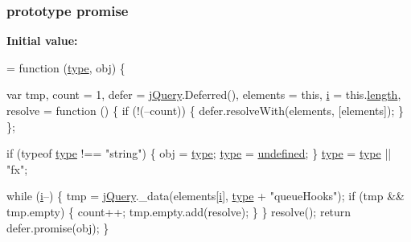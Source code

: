 \subsubsection[{\texorpdfstring{promise}{promise}}]{ {\bf prototype} promise}\hypertarget{jquery-2_82_81-vsdoc_8js_a06426ace6e929cd19d94010b6c27109d}{}\label{jquery-2_82_81-vsdoc_8js_a06426ace6e929cd19d94010b6c27109d}
{\bfseries Initial value\+:}
\begin{DoxyCode}
= \textcolor{keyword}{function} (\hyperlink{jquery-2_82_81-vsdoc_8js_a3940565e83a9bfd10d95ffd27536da91}{type}, obj) \{
        

        var tmp,
            count = 1,
            defer = \hyperlink{jquery-2_82_81-vsdoc_8js_add5237586d970a38a81f990e8eb28c6c}{jQuery}.Deferred(),
            elements = \textcolor{keyword}{this},
            \hyperlink{geolocation-marker_8js_a0325b7ce0988782a8032e720ef3aa411}{i} = this.\hyperlink{jquery-2_82_81-vsdoc_8js_aa7de35d58da66d9944ab9cbe82c19640}{length},
            resolve = \textcolor{keyword}{function} () \{
                \textcolor{keywordflow}{if} (!(--count)) \{
                    defer.resolveWith(elements, [elements]);
                \}
            \};

        \textcolor{keywordflow}{if} (typeof \hyperlink{jquery-2_82_81-vsdoc_8js_a3940565e83a9bfd10d95ffd27536da91}{type} !== \textcolor{stringliteral}{"string"}) \{
            obj = \hyperlink{jquery-2_82_81-vsdoc_8js_a3940565e83a9bfd10d95ffd27536da91}{type};
            \hyperlink{jquery-2_82_81-vsdoc_8js_a3940565e83a9bfd10d95ffd27536da91}{type} = \hyperlink{jquery-2_82_81-vsdoc_8js_a08113a236cc18d2a9d5ce27e638012be}{undefined};
        \}
        \hyperlink{jquery-2_82_81-vsdoc_8js_a3940565e83a9bfd10d95ffd27536da91}{type} = \hyperlink{jquery-2_82_81-vsdoc_8js_a3940565e83a9bfd10d95ffd27536da91}{type} || \textcolor{stringliteral}{"fx"};

        \textcolor{keywordflow}{while} (\hyperlink{geolocation-marker_8js_a0325b7ce0988782a8032e720ef3aa411}{i}--) \{
            tmp = \hyperlink{jquery-2_82_81-vsdoc_8js_add5237586d970a38a81f990e8eb28c6c}{jQuery}.\_data(elements[\hyperlink{geolocation-marker_8js_a0325b7ce0988782a8032e720ef3aa411}{i}], \hyperlink{jquery-2_82_81-vsdoc_8js_a3940565e83a9bfd10d95ffd27536da91}{type} + \textcolor{stringliteral}{"queueHooks"});
            \textcolor{keywordflow}{if} (tmp && tmp.empty) \{
                count++;
                tmp.empty.add(resolve);
            \}
        \}
        resolve();
        \textcolor{keywordflow}{return} defer.promise(obj);
    \}
\end{DoxyCode}
